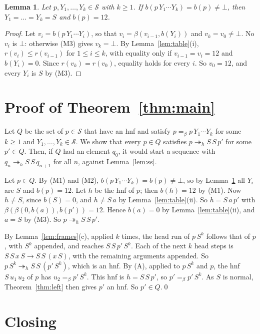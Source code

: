 \documentclass[11pt]{amsart}
\newtheorem{lemma}[theorem]{Lemma}
\newcommand{\Ter}{\mathcal S}
\newcommand{\hred}{\twoheadrightarrow_h}
\newcommand{\conv}{=_\beta}
\newcommand{\bl}{b}
\begin{document}
\begin{lemma}\label{lem:walk}
Let $p,Y_1,\dots,Y_k\in\Ter$ with $k\ge1$. If $\bl(p\,Y_1\cdots Y_k)=\bl(p)\ne\bot$, then
$Y_1=\dots=Y_k=S$ and $\bl(p)=12$.
\end{lemma}

\begin{proof}
Let $v_i=\bl(p\,Y_1\cdots Y_i)$, so that $v_i=\beta(v_{i-1},\bl(Y_i))$ and $v_k=v_0\ne\bot$. No
$v_i$ is $\bot$: otherwise (M3) gives $v_k=\bot$. By Lemma~\ref{lem:table}(i), $r(v_i)\le r(v_{i-1})$ for $1\le i\le k$, with
equality only if $v_{i-1}=v_i=12$ and $\bl(Y_i)=0$. Since $r(v_k)=r(v_0)$, equality holds for
every $i$. So $v_0=12$, and every $Y_i$ is $S$ by (M3).
\end{proof}

\section{Proof of Theorem~\ref{thm:main}}

Let $Q$ be the set of $p\in\Ter$ that have an hnf and satisfy $p\conv p\,Y_1\cdots Y_k$ for some
$k\ge1$ and $Y_1,\dots,Y_k\in\Ter$. We show that every $p\in Q$ satisfies $p\hred S\,S\,p'$ for
some $p'\in Q$. Then, if $Q$ had an element $q_0$, it would start a sequence with
$q_n\hred S\,S\,q_{n+1}$ for all $n$, against Lemma~\ref{lem:ss}.

Let $p\in Q$. By (M1) and (M2), $\bl(p\,Y_1\cdots Y_k)=\bl(p)\ne\bot$, so by Lemma~\ref{lem:walk}
all $Y_i$ are $S$ and $\bl(p)=12$. Let $h$ be the hnf of $p$; then $\bl(h)=12$
by (M1). Now $h\ne S$, since $\bl(S)=0$, and $h\ne S\,a$ by Lemma~\ref{lem:table}(ii). So
$h=S\,a\,p'$ with $\beta(\beta(0,\bl(a)),\bl(p'))=12$. Hence $\bl(a)=0$ by
Lemma~\ref{lem:table}(ii), and $a=S$ by (M3). So $p\hred S\,S\,p'$.

By Lemma~\ref{lem:frames}(c), applied $k$ times, the head run of $p\,S^k$ follows that of $p$,
with $S^k$ appended, and reaches $S\,S\,p'\,S^k$. Each of the next $k$ head
steps is $S\,S\,x\,S\to S\,S\,(x\,S)$, with the remaining arguments appended. So
$p\,S^k\hred S\,S\,(p'\,S^k)$, which is an hnf. By (A), applied to $p\,S^k$ and $p$, the hnf $S\,u_1\,u_2$ of $p$ has
$u_2\conv p'\,S^k$. This hnf is $h=S\,S\,p'$, so
$p'\conv p'\,S^k$. As $S$ is normal, Theorem~\ref{thm:left} then gives $p'$ an hnf. So
$p'\in Q$.\qed

\section{Closing}
\end{document}
